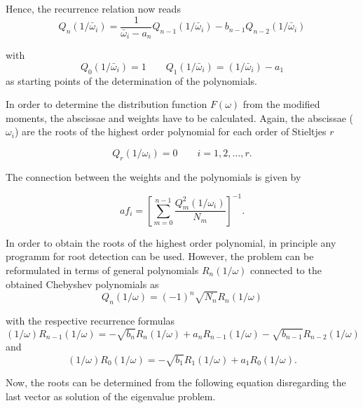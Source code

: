 Hence, the recurrence relation now reads
\begin{equation}
  Q_n(1/\bar{\omega}_i) = \frac{1}{\bar{\omega}_i - a_n} Q_{n-1}(1/\bar{\omega}_i)
                          - b_{n-1} Q_{n-2}(1/\bar{\omega}_i)
\end{equation}

with
\begin{equation}
  Q_0(1/\bar{\omega}_i) = 1 \quad\quad Q_1(1/\bar{\omega}_i) = (1/\bar{\omega}_i) - a_1
\end{equation}
as starting points of the determination of the polynomials.

In order to determine the
distribution function $F(\omega)$ from the modified moments, the abscissae and
weights have to be calculated.
Again, the abscissae ($\omega_i$) are the roots of the
highest order polynomial
for each order of Stieltjes $r$

\begin{equation}
  Q_r(1/\omega_i) = 0 \quad\quad i = 1,2,\dots ,r .
\end{equation}

The connection between the weights and the polynomials is given by

\begin{equation}a  \label{equation:poly_weights}
  f_i = \left[ \sum\limits_{m=0}^{n-1} \frac{Q_m^2(1/\omega_i)}{N_m} \right]^{-1} .
\end{equation}

In order to obtain the roots of the highest order polynomial, in principle
any programm for root detection can be used. However, the problem can
be reformulated in terms of general polynomials $R_n(1/\omega)$ connected
to the obtained Chebyshev polynomials as
\begin{equation}
  Q_n(1/\omega) = (-1)^n \sqrt{N_n} R_n(1/\omega)
\end{equation}

with the respective recurrence formulas
\begin{equation}
  (1/\omega)R_{n-1}(1/\omega) = - \sqrt{b_n}R_n(1/\omega) + a_nR_{n-1}(1/\omega)
                                - \sqrt{b_{n-1}} R_{n-2}(1/\omega)
\end{equation}
and
\begin{equation}
  (1/\omega)R_0(1/\omega) = - \sqrt{b_1}R_1(1/\omega) + a_1 R_0(1/\omega) .
\end{equation}

Now, the roots can be determined from the following equation disregarding the
last vector as solution of the eigenvalue problem.

